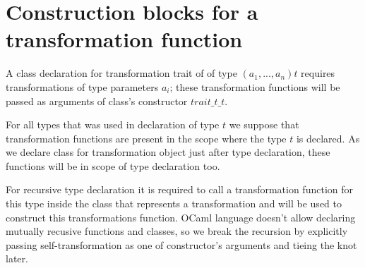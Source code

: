 \documentclass[acmsmall,review,anonymous]{acmart}\settopmatter{printfolios=true,printccs=false,printacmref=false}
\begin{document}
\section{Construction blocks for a transformation function}
\label{sec:constructionblocks}

A class declaration for transformation trait of of type $(a_1,...,a_n) t$ requires transformations of type parameters $a_i$; these transformation functions will be passed as arguments of class's constructor $trait\_t\_t$.

For all types that was used in declaration of type $t$ we suppose that transformation functions are present in the scope where the type $t$ is declared. As we declare class for transformation object just after type declaration, these functions will be in scope of type declaration too.

For recursive type declaration it is required to call a transformation function for this type inside the class that represents a transformation and will be used to construct this transformations function. OCaml language doesn't allow declaring mutually recusive functions and classes, so we break the recursion by explicitly passing self-transformation as one of constructor's arguments and tieing the knot later. 

% 
% 
% 
\end{document}
